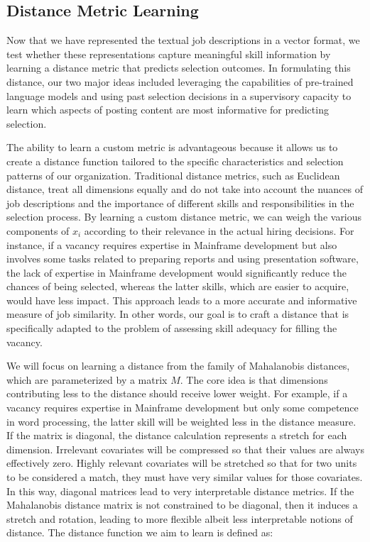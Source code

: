 \subsection{Distance Metric Learning} 

Now that we have represented the textual job descriptions in a vector format, we test whether these representations capture 
meaningful skill information by learning a distance metric that predicts selection outcomes. In formulating this distance, 
our two major ideas included leveraging the capabilities of pre-trained language models and using past selection decisions 
in a supervisory capacity to learn which aspects of posting content are most informative for predicting selection.

The ability to learn a custom metric is advantageous because it allows us to create a distance function tailored to the 
specific characteristics and selection patterns of our organization. Traditional distance metrics, such as Euclidean 
distance, treat all dimensions equally and do not take into account the nuances of job descriptions and the importance 
of different skills and responsibilities in the selection process. By learning a custom distance metric, we can weigh 
the various components of \(x_i\) according to their relevance in the actual hiring decisions. For instance, if a vacancy 
requires expertise in Mainframe development but also involves some tasks related to preparing reports and using 
presentation software, the lack of expertise in Mainframe development would significantly reduce the chances of 
being selected, whereas the latter skills, which are easier to acquire, would have less impact. This approach leads 
to a more accurate and informative measure of job similarity. In other words, our goal is to craft a distance that is 
specifically adapted to the problem of assessing skill adequacy for filling the vacancy.

We will focus on learning a distance from the family of Mahalanobis distances, which are parameterized by a 
matrix \(M\). The core idea is that dimensions contributing less to the distance should receive lower weight. 
For example, if a vacancy requires expertise in Mainframe development but only some competence in word processing, 
the latter skill will be weighted less in the distance measure. If the matrix is diagonal, the distance calculation 
represents a stretch for each dimension. Irrelevant covariates will be compressed so that their values are always 
effectively zero. Highly relevant covariates will be stretched so that for two units to be considered a match, 
they must have very similar values for those covariates. In this way, diagonal matrices lead to very interpretable 
distance metrics. If the Mahalanobis distance matrix is not constrained to be diagonal, then it induces a stretch 
and rotation, leading to more flexible albeit less interpretable notions of distance. The distance function we aim 
to learn is defined as:

